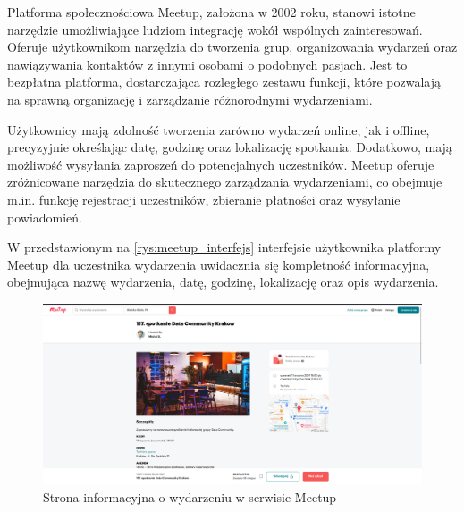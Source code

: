 Platforma społecznościowa Meetup, założona w 2002 roku, stanowi istotne narzędzie umożliwiające ludziom integrację wokół wspólnych zainteresowań. Oferuje użytkownikom narzędzia do tworzenia grup, organizowania wydarzeń oraz nawiązywania kontaktów z innymi osobami o podobnych pasjach. Jest to bezpłatna platforma, dostarczająca rozległego zestawu funkcji, które pozwalają na sprawną organizację i zarządzanie różnorodnymi wydarzeniami. \autocite{meetup}

Użytkownicy mają zdolność tworzenia zarówno wydarzeń online, jak i offline, precyzyjnie określając datę, godzinę oraz lokalizację spotkania. Dodatkowo, mają możliwość wysyłania zaproszeń do potencjalnych uczestników. Meetup oferuje zróżnicowane narzędzia do skutecznego zarządzania wydarzeniami, co obejmuje m.in. funkcję rejestracji uczestników, zbieranie płatności oraz wysyłanie powiadomień.

W przedstawionym na \autoref{rys:meetup_interfejs} interfejsie użytkownika platformy Meetup dla uczestnika wydarzenia uwidacznia się kompletność informacyjna, obejmująca nazwę wydarzenia, datę, godzinę, lokalizację oraz opis wydarzenia.
\begin{figure}[H]
    \begin{center}
    \includegraphics[scale=0.35]{imgs/solutions/meetup.png}
    \end{center}
    \caption{Strona informacyjna o wydarzeniu w serwisie Meetup}
    \label{rys:meetup_interfejs}
    \end{figure}